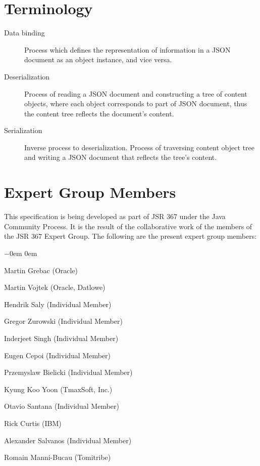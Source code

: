 \section{Terminology}
\label{terminology}

\begin{description}
\item[Data binding] Process which defines the representation of information in a JSON document as an object instance, and vice versa.
\item[Deserialization] Process of reading a JSON document and constructing a tree of content objects, 
where each object corresponds to part of JSON document, thus the content tree reflects the document's content.
\item[Serialization] Inverse process to deserialization. Process of traversing content object tree and writing a JSON document that reflects the tree's content.

\end{description}

\section{Expert Group Members} 
\label{expert_group}

This specification is being developed as part of JSR 367 under the Java Community Process. 
It is the result of the collaborative work of the members of the JSR 367 Expert Group. 
The following are the present expert group members:

\begin{list}{$-$}{\parsep 0em  0em}
\item Martin Grebac (Oracle)
\item Martin Vojtek (Oracle, Datlowe)
\item Hendrik Saly (Individual Member)
\item Gregor Zurowski (Individual Member) 
\item Inderjeet Singh (Individual Member)
\item Eugen Cepoi (Individual Member)
\item Przemyslaw Bielicki (Individual Member)
\item Kyung Koo Yoon (TmaxSoft, Inc.)
\item Otavio Santana (Individual Member)
\item Rick Curtis (IBM)
\item Alexander Salvanos (Individual Member)
\item Romain Manni-Bucau (Tomitribe)
\end{list}

